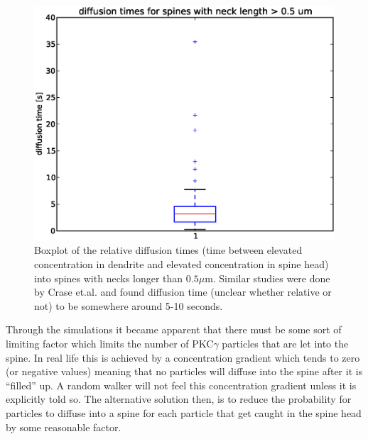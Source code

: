 \documentclass[main.tex]{subfiles}
\begin{document}
\begin{figure}[H]
 \centering
 \includegraphics[scale=0.5]{Figures/spine_stats_boxplot_reltime_longneck.eps}
 \caption[Diffusion time for long necked spines]{Boxplot of the relative diffusion times (time between elevated concentration in dendrite and elevated concentration in spine head) into spines with necks longer than $0.5\mu$m. Similar studies were done by Crase et.al. and found diffusion time (unclear whether relative or not) to be somewhere around 5-10 seconds.}
\end{figure}

Through the simulations it became apparent that there must be some sort of limiting factor which limits the number of PKC$\gamma$ particles that are let into the spine. 
In real life this is achieved by a concentration gradient which tends to zero (or negative values) meaning that no particles will diffuse into the spine after it is ``filled'' up. 
A random walker will not feel this concentration gradient unless it is explicitly told so. 
The alternative solution then, is to reduce the probability for particles to diffuse into a spine for each particle that get caught in the spine head by some reasonable factor. 
\end{document}

